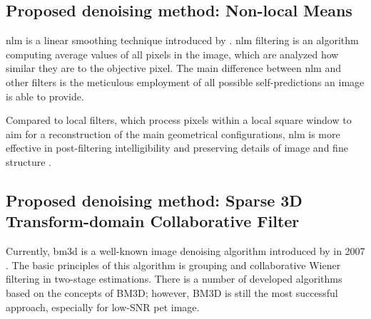\subsection{Proposed denoising method: Non-local Means}

\gls{nlm} is a linear smoothing technique introduced by \citeauthor{buades2005non}. \gls{nlm} filtering
is an algorithm computing average values of all pixels in the image, which are analyzed
how similar they are to the objective pixel. The main difference between \gls{nlm} and other filters is the meticulous employment of all possible self-predictions
an image is able to provide.

Compared to local filters, which process pixels within a local square window to aim
for a reconstruction of the main geometrical configurations, \gls{nlm} is more effective
in post-filtering intelligibility and preserving details of image and fine structure \cite{buades2005non}.


\subsection{Proposed denoising method: Sparse 3D Transform-domain Collaborative Filter}
Currently, \gls{bm3d} is a well-known
image denoising algorithm introduced by \citeauthor{dabov2007image} in 2007 \cite{dabov2007image}. The basic principles
of this algorithm is grouping and collaborative Wiener filtering in two-stage
estimations. There is a number of developed algorithms based on the concepts of
BM3D; however, BM3D is still the most successful
approach, especially for low-SNR \gls{pet} image.



